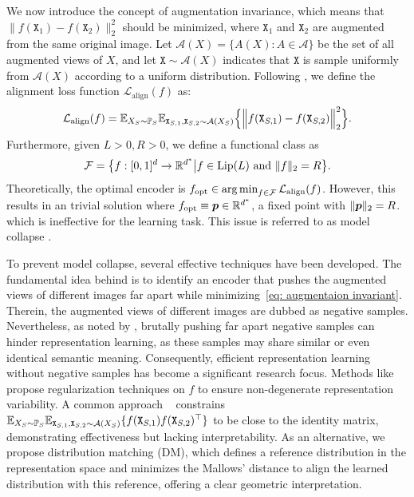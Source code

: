 We now introduce the concept of augmentation invariance, which means that $\|f(\mathtt{X}_{1}) - f(\mathtt{X}_{2})\|_2^2$ should be minimized, where $\mathtt{X}_1$ and $\mathtt{X}_2$ are augmented from the same original image. Let $\mathcal{A}(X) = \{A(X): A  \in \mathcal{A}\}$ be the set of all augmented views of $X$, and let $\mathtt{X} \sim \mathcal{A}(X)$ indicates that $\mathtt{X}$ is sample uniformly from $\mathcal{A}(X)$ according to a uniform distribution. Following \citep{huang2023towards, duan2024unsupervisedtransferlearningadversarial}, we define the alignment loss function $\mathcal{L}_{\mathrm{align}}(f)$ as:
\begin{align}\label{eq: augmentaion invariant}
    \mathcal{L}_{\mathrm{align}}(f) = \mathbb{E}_{X_S \sim \mathbb{P}_S}\mathbb{E}_{\mathtt{X}_{S,1}, \mathtt{X}_{S,2} \sim \mathcal{A}(X_S)}\Big\{\Big\Vert f(\mathtt{X}_{S,1}) - f(\mathtt{X}_{S,2})\Big\Vert_2^2\Big\}.
\end{align}
Furthermore, given $L > 0, R > 0$, we define a functional class as
\begin{align}
    \label{eq: definition of F}
    \mathcal{F} = \big\{f: [0,1]^d \to \mathbb{R}^{d^*} \big\vert f \in \mathrm{Lip}(L) \text{ and }\Vert{f}\Vert_2 = R\big\}.
\end{align}
Theoretically, the optimal encoder is $f_{\mathrm{opt}} \in \operatorname*{arg\,min}_{f \in \mathcal{F}}\mathcal{L}_{\mathrm{align}}(f)$. However, this  results in an trivial solution where $f_{\mathrm{opt}} \equiv \bm{p} \in \mathbb{R}^{d^*}$, a fixed point with $\Vert{\bm{p}}\Vert_2 = R$. which is ineffective for the learning task. This issue is referred to as model collapse \citep{jing2021understanding, zbontar2021barlow}.

To prevent model collapse, several effective techniques have been developed. The fundamental idea behind \citet{ye2019invarspread, he2020momentum, chen2020simclr, haochen2021spectral} is to identify an encoder that pushes the augmented views of different images far apart while minimizing~\eqref{eq: augmentaion invariant}. Therein, the augmented views of different images are dubbed as negative samples. Nevertheless, as noted by \citet{chuang2020debiased, chuang2022robust}, brutally pushing far apart negative samples can hinder representation learning, as these samples may share similar or even identical semantic meaning. Consequently, efficient representation learning without negative samples has become a significant research focus. Methods like \citet{zbontar2021barlow, ermolov2021whitening, adrien2022vicreg, haochen2022beyond} propose regularization techniques on $f$ to ensure non-degenerate representation variability. A common approach ~\citep{haochen2022beyond, haochen2023theoretical, duan2024unsupervisedtransferlearningadversarial} constrains $\mathbb{E}_{X_S \sim \mathbb{P}_S}\mathbb{E}_{\mathtt{X}_{S,1}, \mathtt{X}_{S,2}  \sim \mathcal{A}(X_S)}\{f(\mathtt{X}_{S,1})f(\mathtt{X}_{S,2})^\top\}$ to be close to the identity matrix, demonstrating effectiveness but lacking interpretability. As an alternative, we propose distribution matching (DM), which defines a reference distribution in the representation space and minimizes the Mallows' distance to align the learned distribution with this reference, offering a clear geometric interpretation.



